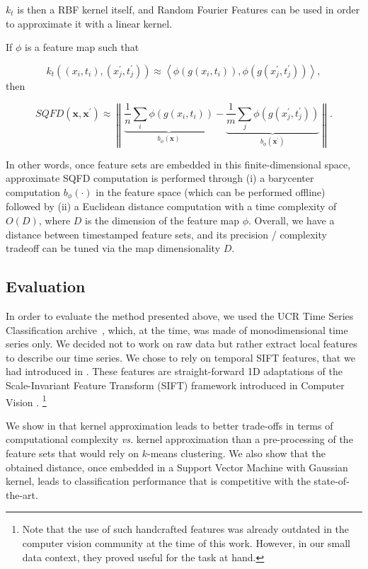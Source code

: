 $k_t$ is then a RBF kernel itself, and
Random Fourier Features \cite{NIPS2007_3182} can be
used in order to approximate it with a linear kernel.

If $\phi$ is a feature map such that

\begin{equation}
k_t((x_{i}, t_i), (x^\prime_j, t^\prime_j)) \approx
    \left\langle\phi(g(x_{i}, t_i)),
        \phi(g(x^\prime_{j}, t^\prime_j))\right\rangle,
\end{equation}
then

\begin{equation}
SQFD(\mathbf{x}, \mathbf{x}^\prime) \approx \left\|
    \underbrace{\frac{1}{n}\sum_i \phi(g(x_{i}, t_i))}_{b_\phi(\mathbf{x})} -
    \underbrace{\frac{1}{m}\sum_j
        \phi(g(x^\prime_{j}, t^\prime_j))}_{b_\phi(\mathbf{x}^\prime)}
    \right\|.
\end{equation}

In other words, once feature sets are embedded in this finite-dimensional
space, approximate SQFD computation is performed through (i) a barycenter
computation $b_\phi(\cdot)$ in the feature space (which can be performed
offline)
followed by (ii) a Euclidean distance computation with a time complexity of
$O(D)$, where $D$ is
the dimension of the feature map $\phi$.
Overall, we have a distance between timestamped feature sets, and
its precision / complexity tradeoff
can be tuned via the map dimensionality $D$.

\subsection{Evaluation}

In order to evaluate the method presented above, we used the UCR Time
Series Classification archive~\cite{ucr}, which, at the time, was made of
monodimensional
time series only.
We decided not to work on raw data but rather extract local features to
describe our time series.
We chose to rely on temporal SIFT features, that we had introduced in
\cite{bailly:halshs-01184900,bailly:hal-01252726}.
These features are straight-forward 1D adaptations of the Scale-Invariant
Feature Transform (SIFT) framework introduced in Computer Vision
\cite{Lowe:2004:DIF:993451.996342}.%
\footnote{Note that the use of such handcrafted features was already outdated in the
computer vision community at the time of this work.
However, in our small data context, they proved useful for the task at hand.}

We show in \cite{tavenard:halshs-01561461} that kernel approximation
leads to better trade-offs in terms of computational
complexity \emph{vs.} kernel approximation than a pre-processing of the feature sets
that would rely on $k$-means clustering.
We also show that the obtained distance, once embedded in a Support Vector
Machine with Gaussian kernel, leads to classification performance that is
competitive with the state-of-the-art.

